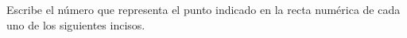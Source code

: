 \documentclass[12pt,addpoints]{evalua}
\begin{document}
\begin{questions}
\begin{multicols}{3}
      \end{multicols}


      \section*{\else{}\fi}
      \subsection*{\else{}\fi}
      \question[4] Escribe el número que representa el punto indicado en la recta numérica de cada uno de los siguientes incisos.

      \begin{multicols}{2}
\end{multicols}
\end{questions}
\end{document}
